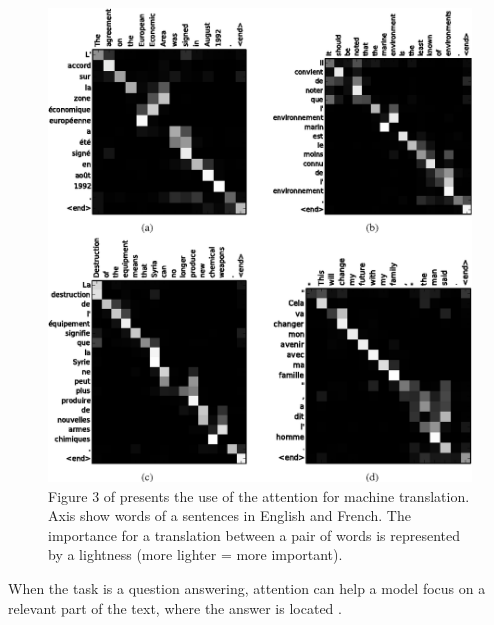 \begin{center}
\begin{figure}[H]
\includegraphics[width=1\columnwidth]{../img/attention_translate}
\caption{Figure 3 of \citep{Bahdanau} presents the use of the attention for machine translation. Axis show words of a sentences in English and French. The importance for a translation between a pair of words is represented by a lightness (more lighter = more important).
}
\label{pic:att_trans}
\end{figure}
\end{center}
When the task is a question answering, attention can help a model focus on a relevant part of the text, where the answer is located \citep{Santos2016}.


